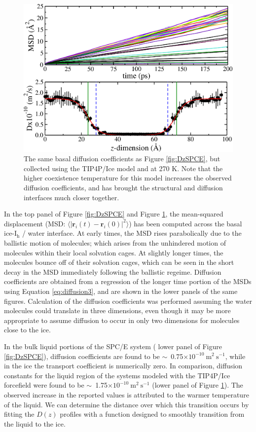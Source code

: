 \begin{figure}
\includegraphics[width=\linewidth]{Figures/DzTIP4PIce}
\caption{\label{fig:DzTIP4PIce} The same basal diffusion coefficients
  as Figure \ref{fig:DzSPCE}, but collected using the TIP4P/Ice model
  and at 270 K. Note that the higher coexistence temperature for this
  model increases the observed diffusion coefficients, and has brought
  the structural and diffusion interfaces much closer together.}
\end{figure}

In the top panel of Figure \ref{fig:DzSPCE} and Figure
\ref{fig:DzTIP4PIce}, the mean-squared displacement (MSD:
$\langle | \mathbf{r}_i(t) - \mathbf{r}_i(0) |^2 \rangle $) has been
computed across the basal ice-I$_\mathrm{h}$ / water interface. At
early times, the MSD rises parabolically due to the ballistic motion
of molecules; which arises from the unhindered motion of molecules
within their local solvation cages. At slightly longer times, the
molecules bounce off of their solvation cages, which can be seen in
the short decay in the MSD immediately following the ballistic
regeime. Diffusion coefficients are obtained from a regression of the
longer time portion of the MSDs using Equation \eqref{eq:diffusion3}, and
are shown in the lower panels of the same figures. Calculation of the
diffusion coefficients was performed assuming the water molecules
could translate in three dimensions, even though it may be more
appropriate to assume diffusion to occur in only two dimensions for
molecules close to the ice.

In the bulk liquid portions of the SPC/E system ( lower panel of
Figure \ref{fig:DzSPCE}), diffusion coefficients are found to be
$\sim$~0.75$\times 10^{-10}~\mathrm{m}^{2}~\mathrm{s}^{-1 }$, while in
the ice the transport coefficient is numerically zero. In comparison,
diffusion constants for the liquid region of the systems modeled with
the TIP4P/Ice forcefield were found to be
$\sim$~1.75$\times 10^{-10}~\mathrm{m}^{2}~\mathrm{s}^{-1 }$ (lower
panel of Figure \ref{fig:DzTIP4PIce}). The observed increase in the
reported values is attributed to the warmer temperature of the
liquid. We can determine the distance over which this transition
occurs by fitting the $D(z)$ profiles with a function designed to
smoothly transition from the liquid to the ice.

